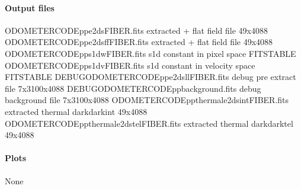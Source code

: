 \documentclass[a4paper,10pt,english]{report}
\begin{document}
\paragraph{Output files}
\label{\detokenize{user/spirou/recipes/thermal:output-files}}
\begin{sphinxVerbatim}[commandchars=\\\{\}]
ODOMETER\PYGZus{}CODE\PYGZus{}pp\PYGZus{}e2ds\PYGZus{}FIBER.fits               extracted + flat field file 49x4088
ODOMETER\PYGZus{}CODE\PYGZus{}pp\PYGZus{}e2dsff\PYGZus{}FIBER.fits             extracted + flat field file 49x4088
ODOMETER\PYGZus{}CODE\PYGZus{}pp\PYGZus{}s1d\PYGZus{}w\PYGZus{}FIBER.fits              s1d constant in pixel space FITS\PYGZhy{}TABLE
ODOMETER\PYGZus{}CODE\PYGZus{}pp\PYGZus{}s1d\PYGZus{}v\PYGZus{}FIBER.fits              s1d constant in velocity space FITS\PYGZhy{}TABLE
DEBUG\PYGZus{}ODOMETER\PYGZus{}CODE\PYGZus{}pp\PYGZus{}e2dsll\PYGZus{}FIBER.fits       debug pre extract file 7x3100x4088
DEBUG\PYGZus{}ODOMETER\PYGZus{}CODE\PYGZus{}pp\PYGZus{}background.fits        debug background file 7x3100x4088
ODOMETER\PYGZus{}CODE\PYGZus{}pp\PYGZus{}thermal\PYGZus{}e2ds\PYGZus{}int\PYGZus{}FIBER.fits   extracted thermal  dark\PYGZus{}dark\PYGZus{}int 49x4088
ODOMETER\PYGZus{}CODE\PYGZus{}pp\PYGZus{}thermal\PYGZus{}e2ds\PYGZus{}tel\PYGZus{}FIBER.fits   extracted thermal  dark\PYGZus{}dark\PYGZus{}tel 49x4088
\end{sphinxVerbatim}


\paragraph{Plots}
\label{\detokenize{user/spirou/recipes/thermal:plots}}
\begin{sphinxVerbatim}[commandchars=\\\{\}]
None
\end{sphinxVerbatim}
\end{document}
